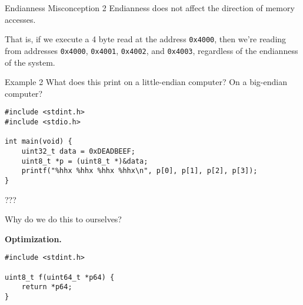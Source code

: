 \documentclass[hyphens,aspectratio=169,dvipsnames]{beamer}
\begin{document}
\begin{frame}[fragile]{Endianness Misconception 2}
    Endianness does not affect the direction of memory accesses.

    That is, if we execute a 4 byte read at the address \texttt{0x4000}, then we're reading from addresses \texttt{0x4000}, \texttt{0x4001}, \texttt{0x4002}, and \texttt{0x4003}, regardless of the endianness of the system.
\end{frame}

\begin{frame}[fragile]{Example 2}
    What does this print on a little-endian computer? On a big-endian computer?
    \begin{verbatim}
#include <stdint.h>
#include <stdio.h>

int main(void) {
    uint32_t data = 0xDEADBEEF;
    uint8_t *p = (uint8_t *)&data;
    printf("%hhx %hhx %hhx %hhx\n", p[0], p[1], p[2], p[3]);
}
    \end{verbatim}
\end{frame}

\begin{frame}[fragile]{???}
    \begin{center}Why do we do this to ourselves?\end{center}

    \pause
    \begin{center}\textbf{Optimization.}\end{center}

    \begin{verbatim}
#include <stdint.h>

uint8_t f(uint64_t *p64) {
    return *p64;
}
    \end{verbatim}
\end{frame}
\end{document}
